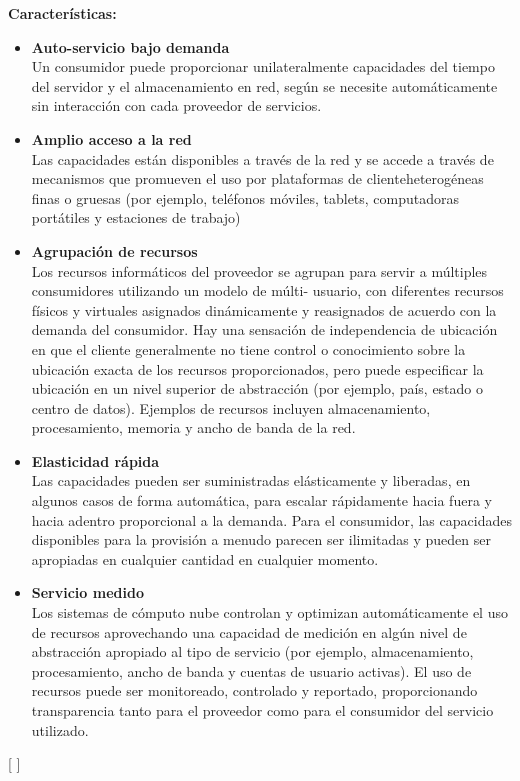 \textbf{Características: }
\begin{itemize}
	\item \textbf {Auto-servicio bajo demanda} \\  Un consumidor puede proporcionar unilateralmente capacidades del tiempo del servidor y el almacenamiento en red, según se necesite automáticamente sin interacción con cada proveedor de servicios.
 	\item \textbf {Amplio acceso a la red} \\   Las capacidades están disponibles a través de la red y se accede a través de mecanismos que promueven el uso por plataformas de clienteheterogéneas finas o gruesas (por ejemplo, teléfonos móviles, tablets, computadoras portátiles y estaciones de trabajo)
	\item \textbf {Agrupación de recursos} \\ Los recursos informáticos del proveedor se agrupan para servir a múltiples consumidores utilizando un modelo de múlti- usuario, con diferentes recursos físicos y virtuales asignados dinámicamente y reasignados de acuerdo con la demanda del consumidor. Hay una sensación de independencia de ubicación en que el cliente generalmente no tiene control o conocimiento sobre la ubicación exacta de los recursos proporcionados, pero puede especificar la ubicación en un nivel superior de abstracción (por ejemplo, país, estado o centro de datos). Ejemplos de recursos incluyen almacenamiento, procesamiento, memoria y ancho de banda de la red.
	\item \textbf{Elasticidad rápida} \\ Las capacidades pueden ser suministradas elásticamente y liberadas, en algunos casos de forma automática, para escalar rápidamente hacia fuera y hacia adentro proporcional a la demanda. Para el consumidor, las capacidades disponibles para la provisión a menudo parecen ser ilimitadas y pueden ser apropiadas en cualquier cantidad en cualquier momento.
	\item \textbf{Servicio medido} \\ Los sistemas de cómputo nube controlan y optimizan automáticamente el uso de recursos aprovechando una capacidad de medición en algún nivel de abstracción apropiado al tipo de servicio (por ejemplo, almacenamiento, procesamiento, ancho de banda y cuentas de usuario activas). El uso de recursos puede ser monitoreado, controlado y reportado, proporcionando transparencia tanto para el proveedor como para el consumidor del servicio utilizado.
\end{itemize} [  ]   \\  \\

